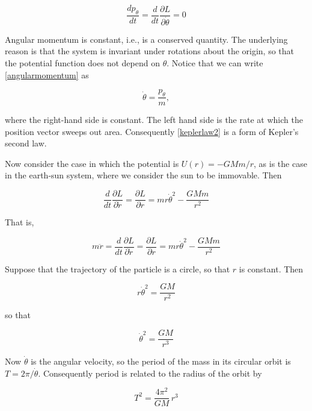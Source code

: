 \begin{equation}
\label{angularmomentum}
\frac{dp_\theta}{dt} = \frac{d}{dt}\frac{\partial L}{\partial \dot \theta} = 0
\end{equation}

Angular momentum is constant, i.e., is a conserved quantity.  The underlying reason is that the system is invariant under rotations about the origin, so that the potential function does not depend on $\theta$.  Notice that we can write \eqref{angularmomentum} as

\begin{equation}
\label{keplerlaw2}
\dot\theta = \frac{p_\theta}{m},
\end{equation}

where the right-hand side is constant.  The left hand side is the rate at which the position vector sweeps out area.   Consequently \eqref{keplerlaw2} is a form of Kepler's second law.

Now consider the case in which the potential is $U(r) = - GMm/r$, as is the case in the earth-sun system, where we consider the sun to be immovable.  Then

\begin{equation}
\frac{d}{dt}\frac{\partial L}{\partial \dot r}
= \frac{\partial L}{\partial r} = mr\dot \theta^2 - \frac{GMm}{r^2}
\end{equation}

That is,

\begin{equation}
m\ddot r = \frac{d}{dt}\frac{\partial L}{\partial \dot r}
= \frac{\partial L}{\partial r} = mr\dot \theta^2 - \frac{GMm}{r^2}
\end{equation}

Suppose that the trajectory of the particle is a circle, so that $r$ is constant.  Then

\begin{equation}
r\dot \theta^2 = \frac{GM}{r^2}
\end{equation}

so that

\begin{equation}
\dot \theta^2 = \frac{GM}{r^3}
\end{equation}

Now $\dot\theta$ is the angular velocity, so the period of the mass in its circular orbit is $T = 2\pi/\dot\theta$.  Consequently period is related to the radius of the orbit by

\begin{equation}
T^2 = \frac{4\pi^2}{GM}\, r^3
\end{equation}

